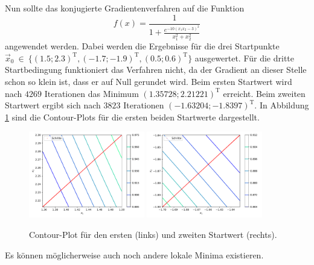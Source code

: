 Nun sollte das konjugierte Gradientenverfahren auf die Funktion
\begin{equation*}
  f(x) = \frac{1}{1 + \frac{e^{-10(x_1 x_2 - 3)^2}}{x_1^2 + x_2^2}}
\end{equation*}
angewendet werden.
Dabei werden die Ergebnisse für die drei Startpunkte \\ {\(\vec{x}_0 \: \in \: \{(\num{1.5}; \num{2.3})^\text{T}, (\num{-1.7}; \num{-1.9})^\text{T}, (\num{0.5}; \num{0.6})^\text{T} \}\)} ausgewertet.
Für die dritte Startbedingung funktioniert das Verfahren nicht, da der Gradient an dieser Stelle schon so klein ist, dass er auf Null gerundet wird.
Beim ersten Startwert wird nach \(\num{4269}\) Iterationen das Minimum \((\num{1.35728};  \num{2.21221})^\text{T}\) erreicht.
Beim zweiten Startwert ergibt sich nach \(\num{3823}\) Iterationen \((\num{-1.63204};  \num{-1.8397})^\text{T}\).
In Abbildung \ref{fig:contour_b} sind die Contour-Plots für die ersten beiden Startwerte dargestellt.
\begin{figure}
  \includegraphics[width=0.45\textwidth]{A1/build/b1.pdf}
  \includegraphics[width=0.45\textwidth]{A1/build/b2.pdf}
  \caption{Contour-Plot für den ersten (links) und zweiten Startwert (rechts).}
  \label{fig:contour_b}
\end{figure}
Es können möglicherweise auch noch andere lokale Minima existieren.
